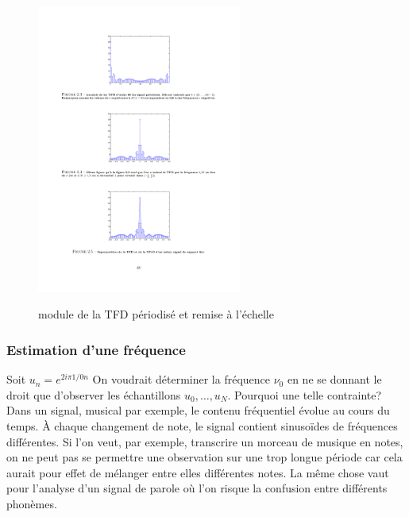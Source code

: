 \begin{figure}
  \centering
  \includegraphics[width=0.6\textwidth]{Figures/Figure2-4}\\
  \caption{module de la TFD p\'eriodis\'e et remise \`a l'\'echelle}\label{fig:figure2-4}
\end{figure}

\subsubsection{Estimation d'une fr\'equence}
Soit $u_{n}=e^{2i\pi 1/0n}$ On voudrait d\'{e}terminer la fr\'{e}quence $\nu_{0}$ en ne se donnant le droit que d'observer les \'{e}chantillons $u_{0}, \ldots, u_{N}$. Pourquoi une telle contrainte? Dans un signal, musical par exemple, le contenu fr\'{e}quentiel \'{e}volue au cours du temps. \`{A} chaque changement de note, le signal contient sinusoïdes de fr\'{e}quences diff\'{e}rentes. Si l'on veut, par exemple, transcrire un morceau de musique en notes, on ne peut pas se permettre une observation sur une trop longue p\'{e}riode car cela aurait pour effet de m\'{e}langer entre elles diff\'{e}rentes notes. La m\^{e}me chose vaut pour l'analyse d'un signal de parole o\`{u} l'on risque la confusion entre diff\'{e}rents phon\`{e}mes.

